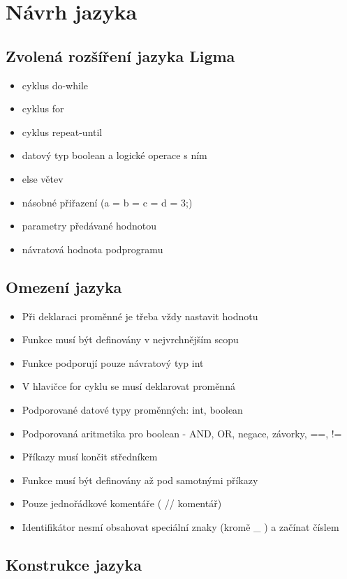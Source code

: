 \documentclass[czech, oth, kiv, he, iso690numb, viewonly]{fasthesis}
\begin{document}
\chapter{Návrh jazyka}

\section{Zvolená rozšíření jazyka Ligma}
\begin{itemize}
    \item cyklus do-while 
    \item cyklus for
    \item cyklus repeat-until
    \item datový typ boolean a logické operace s ním
    \item else větev
    \item násobné přiřazení (a = b = c = d = 3;)
    \item parametry předávané hodnotou
    \item návratová hodnota podprogramu
\end{itemize}

\section{Omezení jazyka}
\begin{itemize}
    \item Při deklaraci proměnné je třeba vždy nastavit hodnotu
    \item Funkce musí být definovány v nejvrchnějším scopu
    \item Funkce podporují pouze návratový typ int
    \item V hlavičce for cyklu se musí deklarovat proměnná
    \item Podporované datové typy proměnných: int, boolean
    \item Podporovaná aritmetika pro boolean - AND, OR, negace, závorky, ==, !=
    \item Příkazy musí končit středníkem
    \item Funkce musí být definovány až pod samotnými příkazy
    \item Pouze jednořádkové komentáře ( // komentář)
    \item Identifikátor nesmí obsahovat speciální znaky (kromě \_ ) a začínat číslem
\end{itemize}

\section{Konstrukce jazyka}
\end{document}
